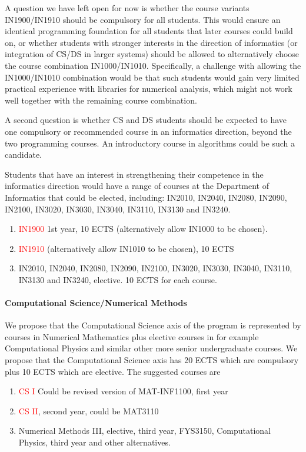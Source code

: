 \documentclass[oneside,final,10pt]{article}
\begin{document}
A question we have left open for now is whether the course variants IN1900/IN1910 should be compulsory for all students. This would ensure an identical programming foundation for all students that later courses could build on, or whether students with stronger interests in the direction of informatics (or integration of CS/DS in larger systems) should be allowed to alternatively choose the course combination IN1000/IN1010. Specifically, a challenge with allowing the IN1000/IN1010 combination would be that such students would gain very limited practical experience with libraries for numerical analysis, which might not work well together with the remaining course combination.

A second question is whether CS and DS students should be expected to have one compulsory or recommended course in an informatics direction, beyond the two programming courses. An introductory course in algorithms could be such a candidate. 

Students that have an interest in strengthening their competence in the informatics direction would have a range of courses at the Department of Informatics that could be elected, including: IN2010, IN2040, IN2080, IN2090, IN2100, IN3020, IN3030, IN3040, IN3110, IN3130 and IN3240.


\begin{enumerate}
    \item \textcolor{red}{IN1900} 1st year, 10 ECTS (alternatively allow IN1000 to be chosen).
    \item \textcolor{red}{IN1910} (alternatively allow IN1010 to be chosen), 10 ECTS
    \item IN2010, IN2040, IN2080, IN2090, IN2100, IN3020, IN3030, IN3040, IN3110, IN3130 and IN3240, elective. 10 ECTS for each course. 
\end{enumerate}


\paragraph{Computational Science/Numerical Methods}
We propose that the Computational Science axis of the program is represented by courses in Numerical Mathematics plus elective courses in for example Computational Physics and similar other more senior undergraduate courses. We propose that the Computational Science axis has 
20 ECTS which are compulsory plus  10 ECTS which are  elective. The suggested courses are
\begin{enumerate}
    \item \textcolor{red}{CS I} Could be revised version of MAT-INF1100, first year %
    \item \textcolor{red}{CS II}, second year, could be MAT3110
    \item Numerical Methods III, elective,  third year, FYS3150, Computational Physics, third year and other alternatives. 
\end{enumerate}
\end{document}
